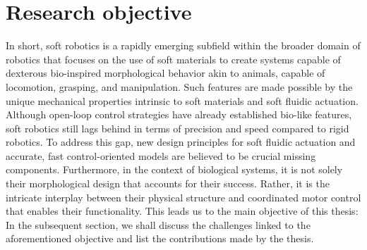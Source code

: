 \vspace{-3mm}
\section{Research objective}
In short, soft robotics is a rapidly emerging subfield within the broader domain of robotics that focuses on the use of soft materials to create systems capable of dexterous bio-inspired morphological behavior akin to animals, capable of locomotion, grasping, and manipulation. Such features are made possible by the unique mechanical properties intrinsic to soft materials and soft fluidic actuation. Although open-loop control strategies have already established bio-like features, soft robotics still lags behind in terms of precision and speed compared to rigid robotics. To address this gap, new design principles for soft fluidic actuation and accurate, fast control-oriented models are believed to be crucial missing components. Furthermore, in the context of biological systems, it is not solely their morphological design that accounts for their success. Rather, it is the intricate interplay between their physical structure and coordinated motor control that enables their functionality. This leads us to the main objective of this thesis:
%
%
\noindent In the subsequent section, we shall discuss the challenges linked to the aforementioned objective and list the contributions made by the thesis. \vspace{-3mm}

